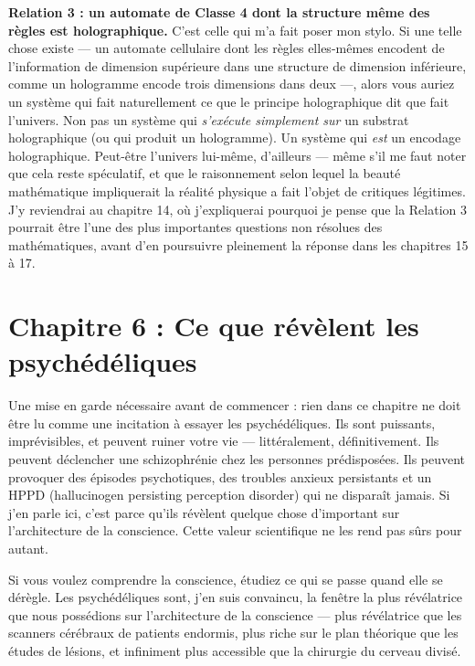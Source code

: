 \documentclass[11pt, twoside, openright]{book}
\begin{document}
\textbf{Relation 3 : un automate de Classe 4 dont la structure même des règles est holographique.} C'est celle qui m'a fait poser mon stylo. Si une telle chose existe --- un automate cellulaire dont les règles elles-mêmes encodent de l'information de dimension supérieure dans une structure de dimension inférieure, comme un hologramme encode trois dimensions dans deux ---, alors vous auriez un système qui fait naturellement ce que le principe holographique dit que fait l'univers. Non pas un système qui \textit{s'exécute simplement sur} un substrat holographique (ou qui produit un hologramme). Un système qui \textit{est} un encodage holographique. Peut-être l'univers lui-même, d'ailleurs --- même s'il me faut noter que cela reste spéculatif, et que le raisonnement selon lequel la beauté mathématique impliquerait la réalité physique a fait l'objet de critiques légitimes. J'y reviendrai au chapitre 14, où j'expliquerai pourquoi je pense que la Relation 3 pourrait être l'une des plus importantes questions non résolues des mathématiques, avant d'en poursuivre pleinement la réponse dans les chapitres 15 à 17.


\chapter*{Chapitre 6 : Ce que révèlent les psychédéliques}

Une mise en garde nécessaire avant de commencer : rien dans ce chapitre ne doit être lu comme une incitation à essayer les psychédéliques. Ils sont puissants, imprévisibles, et peuvent ruiner votre vie --- littéralement, définitivement. Ils peuvent déclencher une schizophrénie chez les personnes prédisposées. Ils peuvent provoquer des épisodes psychotiques, des troubles anxieux persistants et un HPPD (hallucinogen persisting perception disorder) qui ne disparaît jamais. Si j'en parle ici, c'est parce qu'ils révèlent quelque chose d'important sur l'architecture de la conscience. Cette valeur scientifique ne les rend pas sûrs pour autant.

Si vous voulez comprendre la conscience, étudiez ce qui se passe quand elle se dérègle. Les psychédéliques sont, j'en suis convaincu, la fenêtre la plus révélatrice que nous possédions sur l'architecture de la conscience --- plus révélatrice que les scanners cérébraux de patients endormis, plus riche sur le plan théorique que les études de lésions, et infiniment plus accessible que la chirurgie du cerveau divisé.
\end{document}
